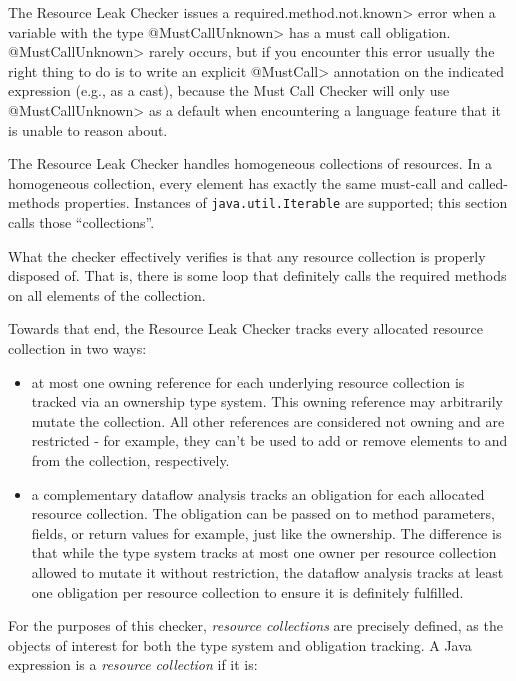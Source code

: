 The Resource Leak Checker issues a \<required.method.not.known> error
when a variable with the type \<@MustCallUnknown> has a must call obligation.
\<@MustCallUnknown> rarely occurs, but if you encounter this error usually
the right thing to do is to write an explicit \<@MustCall> annotation
on the indicated expression (e.g., as a cast), because the Must Call Checker
will only use \<@MustCallUnknown> as a default when encountering a language
feature that it is unable to reason about.


The Resource Leak Checker handles homogeneous collections of resources. In a homogeneous collection, every element
has exactly the same must-call and called-methods properties. Instances of \texttt{java.util.Iterable} are supported;
this section calls those ``collections''.

What the checker effectively verifies is that any resource collection is properly disposed of. That is, there is some loop that definitely calls the required methods on all elements of the collection.

Towards that end, the Resource Leak Checker tracks every allocated resource collection in two ways:

\begin{itemize}
  \item at most one owning reference for each underlying resource collection is tracked via an ownership type system. This owning reference may arbitrarily mutate the collection. All other references are considered not owning and are restricted - for example, they can't be used to add or remove elements to and from the collection, respectively.
  \item a complementary dataflow analysis tracks an obligation for each allocated resource collection. The obligation can be passed on to method parameters, fields, or return values for example, just like the ownership. The difference is that while the type system tracks at most one owner per resource collection allowed to mutate it without restriction, the dataflow analysis tracks at least one obligation per resource collection to ensure it is definitely fulfilled.
\end{itemize}

For the purposes of this checker, \textit{resource collections} are precisely defined, as the objects of interest for both the type system and obligation tracking. A Java expression is a \textit{resource collection} if it is:

